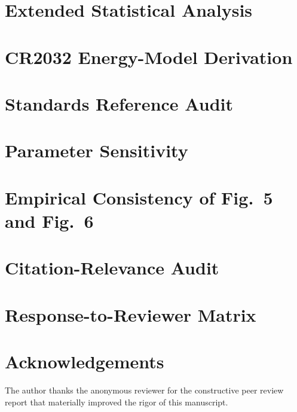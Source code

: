 \documentclass[journal,twoside,web]{IEEEtran}
\begin{document}
\section{Extended Statistical Analysis}
\label{app:stats}

\section{CR2032 Energy-Model Derivation}
\label{app:energy}

\section{Standards Reference Audit}
\label{app:standards}

\section{Parameter Sensitivity}
\label{app:sensitivity}

\section{Empirical Consistency of Fig.~5 and Fig.~6}
\label{app:fig5fig6}

\section{Citation-Relevance Audit}
\label{app:citation}

\section{Response-to-Reviewer Matrix}
\label{app:reviewer}

\section*{Acknowledgements}
The author thanks the anonymous reviewer for the constructive peer
review report that materially improved the rigor of this manuscript.
\end{document}
